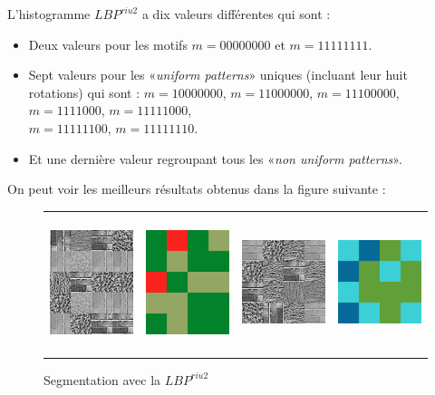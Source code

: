 \indent L'histogramme $LBP^{riu2}$ a dix valeurs différentes qui sont :
\begin{itemize}
\item Deux valeurs pour les motifs $m=00000000$ et $m=11111111$.
\item Sept valeurs pour les «\textit{uniform patterns}» uniques (incluant leur huit rotations) qui sont : $m=10000000$, $m=11000000$, $m=11100000$, $m=1111000$, $m=11111000$, \\
$m=11111100$, $m=11111110$.
\item Et une dernière valeur regroupant tous les «\textit{non uniform patterns}».\\
\end{itemize}

\indent On peut voir les meilleurs résultats obtenus dans la figure suivante :

\begin{figure}[H]
\centering
\begin{tabular}{cccc}
\centering

\includegraphics[width=4cm,height=4cm]{Figures/chap2/t1.png}
&
\includegraphics[width=4cm,height=4cm]{Figures/chap2/w1.png}
&
\includegraphics[width=4cm,height=4cm]{Figures/chap2/t2.png}
&
\includegraphics[width=4cm,height=4cm]{Figures/chap2/w2.png}
\end{tabular}
\caption[text3]{Segmentation avec la $LBP^{riu2}$}
\end{figure}

